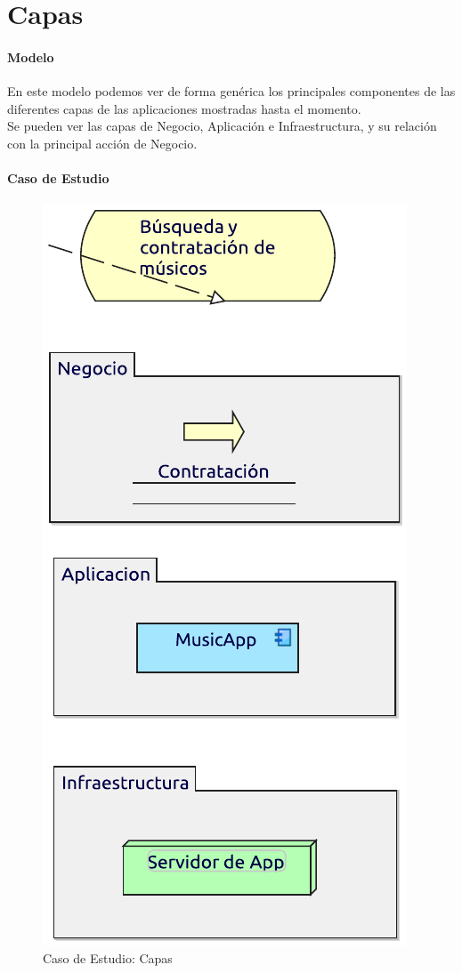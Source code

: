 \newpage

\section{Capas}
\paragraph{Modelo}
En este modelo podemos ver de forma genérica los principales componentes de las diferentes capas de las aplicaciones mostradas hasta el momento. \\

Se pueden ver las capas de Negocio, Aplicación e Infraestructura, y su relación con la principal acción de Negocio.
\paragraph{Caso de Estudio}

\begin{figure}[hbt!]
	\centering
	\includegraphics[width=0.4\linewidth]{Desarrollo/ArquitecturaEmpresarial/Tecnologia/imgs/capas.pdf}
	\caption{Caso de Estudio: Capas}
\end{figure}
